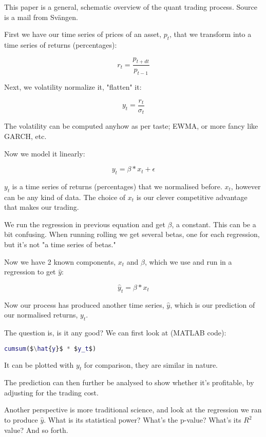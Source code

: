 \documentclass[a4paper]{article}
\title{\documenttitle}
\date{\today}
\author{Frans Englich \href{mailto:fenglich@fastmail.fm}{fenglich@fastmail.fm}}
\begin{document}
\maketitle

This paper is a general, schematic overview of the quant trading process. Source is a mail from Svängen.

First we have our time series of prices of an asset, $p_t$, that we transform into a time series of returns (percentages):

\begin{equation*}
    r_t = \frac{p_{t + dt}}{p_{t - 1}}
\end{equation*}

Next, we volatility normalize it, "flatten" it:

\begin{equation*}
    y_t = \frac{r_t}{\sigma_t}
\end{equation*}

The volatility can be computed anyhow as per taste; EWMA, or more fancy like GARCH, etc.

Now we model it linearly:

\begin{equation*}
    y_t = \beta*x_t + \epsilon
\end{equation*}

$y_t$ is a time series of returns (percentages) that we normalised before. $x_t$, however can be any kind of data. The choice of $x_t$ is our clever competitive advantage that makes our trading.

We run the regression in previous equation and get $\beta$, a constant. This can be a bit confusing. When running rolling we get several betas, one for each regression, but it's not "a time series of betas."

Now we have 2 known components, $x_t$ and $\beta$, which we use and run in a regression to get $\hat{y}$:

\begin{equation*}
    \hat{y}_t = \beta*x_t   
\end{equation*}

Now our process has produced another time series, $\hat{y}$, which is our prediction of our normalised returns, $y_t$.

The question is, is it any good? We can first look at (MATLAB code):

\begin{lstlisting}[language=Matlab, mathescape=true]
cumsum($\hat{y}$ * $y_t$)
\end{lstlisting}

It can be plotted with $y_t$ for comparison, they are similar in nature.

The prediction can then further be analysed to show whether it's profitable, by adjusting for the trading cost.

Another perspective is more traditional science, and look at the regression we ran to produce $\hat{y}$. What is its statistical power? What's the p-value? What's its $R^2$ value? And so forth.
\end{document}
